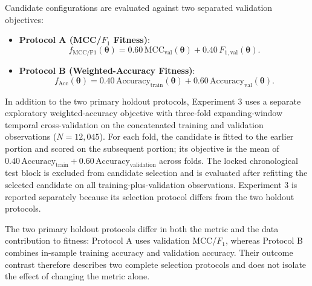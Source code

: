 Candidate configurations are evaluated against two separated validation objectives:
\begin{itemize}
    \item \textbf{Protocol A (MCC/$F_1$ Fitness)}:
    \begin{equation}\label{eq:fitness_protocol_a}
    f_{\mathrm{MCC/F1}}(\boldsymbol{\theta}) = 0.60\,\mathrm{MCC}_{\mathrm{val}}(\boldsymbol{\theta}) + 0.40\,F_{1,\mathrm{val}}(\boldsymbol{\theta}).
    \end{equation}
    \item \textbf{Protocol B (Weighted-Accuracy Fitness)}:
    \begin{equation}\label{eq:fitness_protocol_b}
    f_{\mathrm{Acc}}(\boldsymbol{\theta}) = 0.40\,\mathrm{Accuracy}_{\mathrm{train}}(\boldsymbol{\theta}) + 0.60\,\mathrm{Accuracy}_{\mathrm{val}}(\boldsymbol{\theta}).
    \end{equation}
\end{itemize}

In addition to the two primary holdout protocols, Experiment 3 uses a separate exploratory weighted-accuracy objective with three-fold expanding-window temporal cross-validation on the concatenated training and validation observations ($N=12{,}045$). For each fold, the candidate is fitted to the earlier portion and scored on the subsequent portion; its objective is the mean of $0.40\,\mathrm{Accuracy}_{\mathrm{train}}+0.60\,\mathrm{Accuracy}_{\mathrm{validation}}$ across folds. The locked chronological test block is excluded from candidate selection and is evaluated after refitting the selected candidate on all training-plus-validation observations. Experiment 3 is reported separately because its selection protocol differs from the two holdout protocols.

The two primary holdout protocols differ in both the metric and the data contribution to fitness: Protocol A uses validation MCC/$F_1$, whereas Protocol B combines in-sample training accuracy and validation accuracy. Their outcome contrast therefore describes two complete selection protocols and does not isolate the effect of changing the metric alone.


